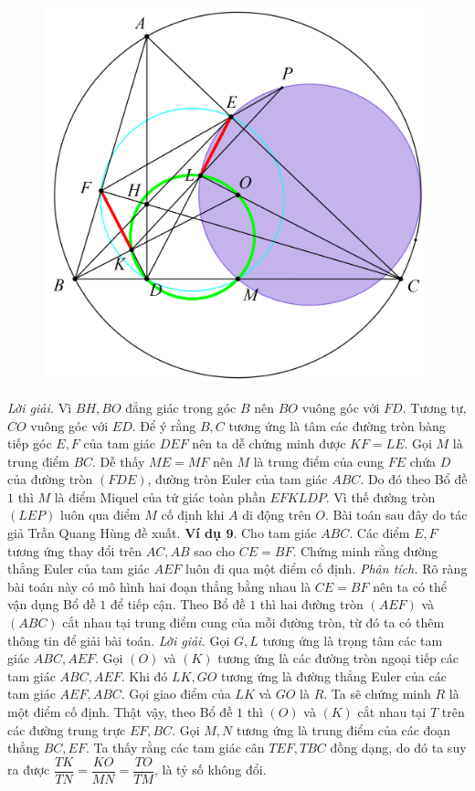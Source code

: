 \begin{multicols}{2}
\begin{figure}[H]
		\includegraphics[width= 1\linewidth]{16}
		\vspace*{-10pt}
	\end{figure}
	\textit{Lời giải.} Vì $BH, BO$ đẳng giác trong góc $B$ nên $BO$ vuông góc với $FD$. Tương tự, $CO$ vuông góc với $ED$. Để ý rằng $B,C$ tương ứng là tâm các đường tròn bàng tiếp góc $E,F$ của tam giác $DEF$ nên ta dễ chứng minh được $KF=LE$. Gọi $M$ là trung điểm $BC$. Dễ thấy $ME=MF$ nên $M$ là trung điểm của cung $FE$ chứa $D$ của đường tròn $(FDE)$, đường tròn Euler của tam giác $ABC$. Do đó theo Bổ đề $1$ thì $M$ là điểm Miquel của tứ giác toàn phần $EFKLDP$. Vì thế đường tròn $(LEP)$ luôn qua điểm $M$ cố định khi $A$ di động trên $O$.
	\vskip 0.1cm
	Bài toán sau đây do tác giả Trần Quang Hùng đề xuất.
	\vskip 0.1cm
	\textbf{\color{diendantoanhoc}Ví dụ $\pmb{9.}$} Cho tam giác $ABC$. Các điểm $E,F$ tương ứng thay đổi trên $AC,AB$ sao cho $CE=BF$. Chứng minh rằng đường thẳng Euler của tam giác $AEF$ luôn đi qua một điểm cố định.
	\vskip 0.1cm
	\textit{Phân tích.} Rõ ràng bài toán này có mô hình hai đoạn thẳng bằng nhau là $CE=BF$ nên ta có thể vận dụng Bổ đề $1$ để tiếp cận. Theo Bổ đề $1$ thì hai đường tròn $(AEF)$ và $(ABC)$ cắt nhau tại trung điểm cung của mỗi đường tròn, từ đó ta có thêm thông tin để giải bài toán.
	\vskip 0.1cm
	\textit{Lời giải.} Gọi $ G,L$ tương ứng là trọng tâm các tam giác $ABC,AEF$. Gọi $(O)$ và $(K)$ tương ứng là các đường tròn ngoại tiếp các tam giác $ABC, AEF$. Khi đó $LK,GO$ tương ứng là đường thẳng Euler của các tam giác $AEF,ABC$. Gọi giao điểm của $LK$ và $ GO$ là $R$. Ta sẽ chứng minh $R$ là một điểm cố định. Thật vậy, theo Bổ đề $1$ thì $(O)$ và $(K)$ cắt nhau tại $T$ trên các đường trung trực $EF,BC$. Gọi $ M,N$ tương ứng là trung điểm của các đoạn thẳng $BC,EF$. Ta thấy rằng các tam giác cân $TEF,TBC$ đồng dạng, do đó ta suy ra được $\dfrac{TK}{TN} = \dfrac{KO}{MN} = \dfrac{TO}{TM}$, là tỷ số không đổi.

\end{multicols}
